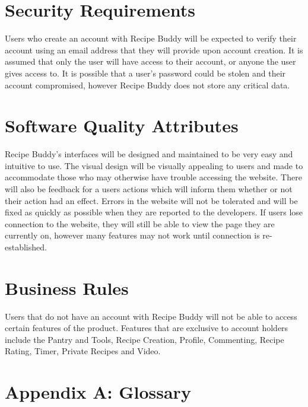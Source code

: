 \documentclass{scrreprt}
\begin{document}
\section{Security Requirements}
Users who create an account with \gls{Recipe Buddy} will be expected to verify their account using an email address that they will provide upon account creation. It is assumed that only the user will have access to their account, or anyone the user gives access to. It is possible that a user's password could be stolen and their account compromised, however \gls{Recipe Buddy} does not store any critical data.

\section{Software Quality Attributes}
\gls{Recipe Buddy}'s interfaces will be designed and maintained to be very easy and intuitive to use. The visual design will be visually appealing to users and made to accommodate those who may otherwise have trouble accessing the website. There will also be feedback for a users actions which will inform them whether or not their action had an effect. Errors in the website will not be tolerated and will be fixed as quickly as possible when they are reported to the developers. If users lose connection to the website, they will still be able to view the page they are currently on, however many features may not work until connection is re-established.

\section{Business Rules}
Users that do not have an account with \gls{Recipe Buddy} will not be able to access certain features of the product. Features that are exclusive to account holders include the Pantry and Tools, Recipe Creation, Profile, Commenting, Recipe Rating, Timer, Private Recipes and Video.

\section{Appendix A: Glossary}
\printglossaries


\end{document}
